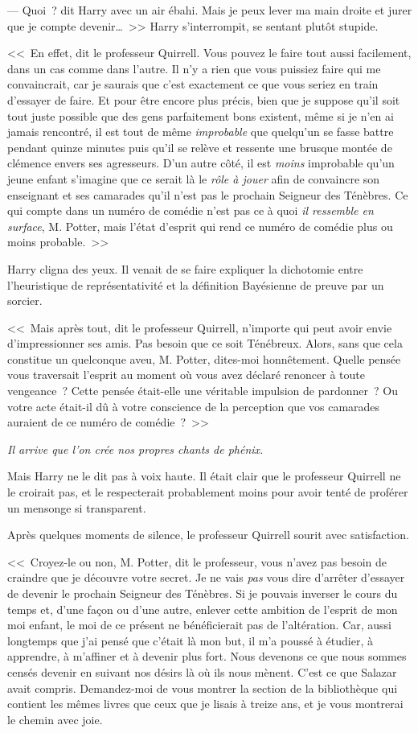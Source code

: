--- Quoi~? dit Harry avec un air ébahi. Mais je peux lever ma main droite et jurer que je compte devenir…~>> Harry s'interrompit, se sentant plutôt stupide.

<<~En effet, dit le professeur Quirrell. Vous pouvez le faire tout aussi facilement, dans un cas comme dans l'autre. Il n'y a rien que vous puissiez faire qui me convaincrait, car je saurais que c'est exactement ce que vous seriez en train d'essayer de faire. Et pour être encore plus précis, bien que je suppose qu'il soit tout juste possible que des gens parfaitement bons existent, même si je n'en ai jamais rencontré, il est tout de même \emph{improbable} que quelqu'un se fasse battre pendant quinze minutes puis qu'il se relève et ressente une brusque montée de clémence envers ses agresseurs. D'un autre côté, il est \emph{moins} improbable qu'un jeune enfant s'imagine que ce serait là le \emph{rôle à jouer} afin de convaincre son enseignant et ses camarades qu'il n'est pas le prochain Seigneur des Ténèbres. Ce qui compte dans un numéro de comédie n'est pas ce à quoi \emph{il ressemble en surface}, M. Potter, mais l'état d'esprit qui rend ce numéro de comédie plus ou moins probable.~>>

Harry cligna des yeux. Il venait de se faire expliquer la dichotomie entre l'heuristique de représentativité et la définition Bayésienne de preuve par un sorcier.

<<~Mais après tout, dit le professeur Quirrell, n'importe qui peut avoir envie d'impressionner ses amis. Pas besoin que ce soit Ténébreux. Alors, sans que cela constitue un quelconque aveu, M. Potter, dites-moi honnêtement. Quelle pensée vous traversait l'esprit au moment où vous avez déclaré renoncer à toute vengeance~? Cette pensée était-elle une véritable impulsion de pardonner~? Ou votre acte était-il dû à votre conscience de la perception que vos camarades auraient de ce numéro de comédie~?~>>

\emph{Il arrive que l'on crée nos propres chants de phénix.}

Mais Harry ne le dit pas à voix haute. Il était clair que le professeur Quirrell ne le croirait pas, et le respecterait probablement moins pour avoir tenté de proférer un mensonge si transparent.

Après quelques moments de silence, le professeur Quirrell sourit avec satisfaction.

<<~Croyez-le ou non, M. Potter, dit le professeur, vous n'avez pas besoin de craindre que je découvre votre secret. Je ne vais \emph{pas} vous dire d'arrêter d'essayer de devenir le prochain Seigneur des Ténèbres. Si je pouvais inverser le cours du temps et, d'une façon ou d'une autre, enlever cette ambition de l'esprit de mon moi enfant, le moi de ce présent ne bénéficierait pas de l'altération. Car, aussi longtemps que j'ai pensé que c'était là mon but, il m'a poussé à étudier, à apprendre, à m'affiner et à devenir plus fort. Nous devenons ce que nous sommes censés devenir en suivant nos désirs là où ils nous mènent. C'est ce que Salazar avait compris. Demandez-moi de vous montrer la section de la bibliothèque qui contient les mêmes livres que ceux que je lisais à treize ans, et je vous montrerai le chemin avec joie.

